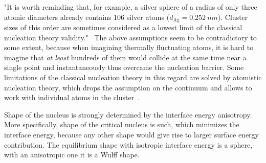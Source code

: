 "It is worth reminding that, for example, a silver sphere of a radius of only three atomic diameters already contains 106 silver atoms ($d_{\mathrm{Ag}} = \qty{0.252}{nm}$). Cluster sizes of this order are sometimes considered as a lowest limit of the classical nucleation theory validity."~\cite{Milchev2008} The above assumptions seem to be contradictory to some extent, because when imagining thermally fluctuating atoms, it is hard to imagine that \textit{at least} hundreds of them would collide at the same time near a single point and instantaneously thus overcame the nucleation barrier. Some limitations of the classical nucleation theory in this regard are solved by atomistic nucleation theory, which drops the assumption on the continuum and allows to work with individual atoms in the cluster~\cite{Kozlov2003, Milchev2008}.





Shape of the nucleus is strongly determined by the interface energy anisotropy. More specifically, shape of the critical nucleus is such, which minimizes the interface energy, because any other shape would give rise to larger surface energy contribution. The equilibrium shape with isotropic interface energy is a sphere, with an anisotropic one it is a Wulff shape.

